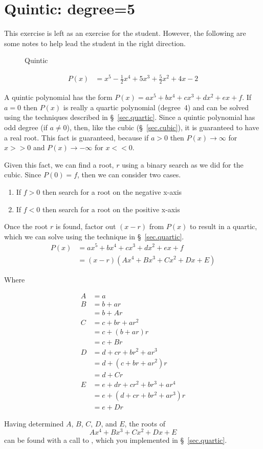 \section{Quintic: degree=5}
\label{sec.quintic}

This exercise is left as an exercise for the student.  However, the
following are some notes to help lead the student in the right
direction.

\begin{figure}
\centering

\caption{Quintic}
\label{fig.quintic}
\end{figure}

\begin{align*}
  P(x) &= x^5 - \frac{1}{2} x^4 + 5 x^3 + \frac{5}{2} x^2 + 4 x - 2
\end{align*}


A quintic polynomial has the form $P(x) = a x^5 + b x^4 + c x^3 + d x^2 + e x + f$.
If $a=0$ then $P(x)$ is really a quartic polynomial
(degree~4) and can be solved using the techniques described in
\S~\ref{sec.quartic}.  Since a quintic polynomial has odd degree
(if $a\neq 0$), then, like the cubic (\S~\ref{sec.cubic}), it is
guaranteed to have a real root.  This fact is guaranteed, because if
$a>0$ then $P(x)\to \infty$ for $x>>0$ and $P(x)\to -\infty$ for
$x<<0$.

Given this fact, we can find a root, $r$ using a binary search as we
did for the cubic.  Since $P(0) = f$, then we can consider two cases.
\begin{enumerate}
\item If $f>0$ then search for a root on the negative x-axis
\item If $f<0$ then search for a root on the positive x-axis
\end{enumerate}

Once the root $r$ is found, factor out $(x-r)$ from $P(x)$ to result
in a quartic, which we can solve using the technique in
\S~\ref{sec.quartic}.
\begin{align*}
  P(x) &= a x^5 + b x^4 + c x^3 + d x^2 + e x + f\\
  &= (x - r) (Ax^4 + B x^3 + C x^2 + D x + E)
\end{align*}

Where

\begin{align}
  A &= a\label{eq.8.A}\\
  B &= b + a r\nonumber\\
   &= b + A r\label{eq.8.B}\\
  C &= c + b r + a r^2\nonumber\\
  &= c + (b + a r)r\nonumber\\
  &= c + B r\label{eq.8.C}\\
  D &= d + c r + b r^2 + a r^3\nonumber\\
  &= d + ( c + b r + a r^2)r\nonumber\\
  &= d + C r\label{eq.8.D}\\
  E &= e + d r + c r^2 + b r^3 + a r^4\nonumber\\
  &= e + ( d + c r + b r^2 + a r^3)r\nonumber\\
  &= e + D r\label{eq.8.E}
\end{align}


Having determined $A$, $B$, $C$, $D$, and $E$, the roots of
\[A x^4 + B x^3 + C x^2 + D x + E\] can be
found with a call to , which you
implemented in \S~\ref{sec.quartic}.



